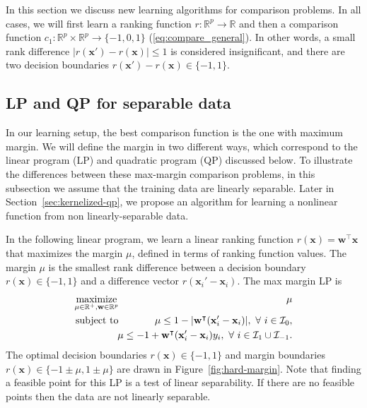 \documentclass[twoside,11pt]{article}
\newcommand{\RR}{\mathbb R}
\DeclareMathOperator*{\maximize}{maximize}
\begin{document}
In this section we discuss new learning algorithms for comparison
problems. In all cases, we will first learn a ranking function
$r:\RR^p\rightarrow\RR$ and then a comparison function
$c_1:\RR^p\times \RR^p\rightarrow\{-1,0,1\}$
(\ref{eq:compare_general}). In other words, a small rank difference
$|r(\mathbf x')-r(\mathbf x)|\leq 1$ is considered insignificant, and
there are two decision boundaries $r(\mathbf x')-r(\mathbf
x)\in\{-1,1\}$.

\subsection{LP and QP for separable data}
\label{sec:lp-qp}

In our learning setup, the best comparison function is the one with
maximum margin. We will define the margin in two different ways, which
correspond to the linear program (LP) and quadratic program (QP)
discussed below. To illustrate the differences between these
max-margin comparison problems, in this subsection we assume that the
training data are linearly separable. Later in
Section~\ref{sec:kernelized-qp}, we propose an algorithm for learning
a nonlinear function from non linearly-separable data.

In the following linear program, we learn a linear ranking function
$r(\mathbf x)=\mathbf w^\intercal \mathbf x$ that maximizes the margin
$\mu$, defined in terms of ranking function values. The margin $\mu$
is the smallest rank difference between a decision boundary $r(\mathbf
x)\in\{-1,1\}$ and a difference vector $r(\mathbf x_i'-\mathbf
x_i)$. The max margin LP is
\begin{eqnarray}
  \label{eq:max-margin-lp}
  \maximize_{\mu\in\RR^+, \mathbf w\in\RR^p}\ &&\hskip -0.5cm \mu \\
  \nonumber
  \text{subject to}\ && \hskip -0.5cm \mu \leq
  1-|\mathbf w^\intercal (\mathbf x_i' - \mathbf x_i)|,\ 
  \forall\  i\in \mathcal I_0,\\
  \nonumber
  &&\hskip -0.5cm
  \mu \leq -1 +  \mathbf w^\intercal(\mathbf x_i'-\mathbf x_i)y_i,
  \ \forall\ i\in \mathcal I_1\cup \mathcal I_{-1}.
\end{eqnarray}
The optimal decision boundaries $r(\mathbf x)\in\{-1,1\}$ and margin
boundaries $r(\mathbf x)\in\{-1\pm \mu, 1 \pm \mu\}$ are drawn 
in Figure~\ref{fig:hard-margin}. Note that finding a feasible point
for this LP is a test of linear separability. If there are no feasible
points then the data are not linearly separable.
\end{document}
